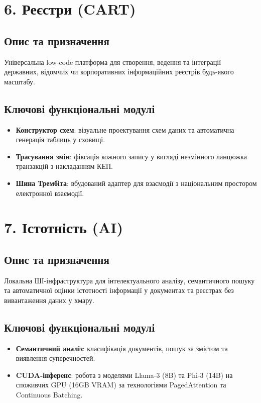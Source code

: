 \section{6. Реєстри (CART)}
\subsection{Опис та призначення}
Універсальна low-code платформа для створення, ведення та інтеграції державних, відомчих чи корпоративних інформаційних реєстрів будь-якого масштабу.
\subsection{Ключові функціональні модулі}
\begin{itemize}
    \item \textbf{Конструктор схем}: візуальне проектування схем даних та автоматична генерація таблиць у сховищі.
    \item \textbf{Трасування змін}: фіксація кожного запису у вигляді незмінного ланцюжка транзакцій з накладанням КЕП.
    \item \textbf{Шина Трембіта}: вбудований адаптер для взаємодії з національним простором електронної взаємодії.
\end{itemize}

\section{7. Істотність (AI)}
\subsection{Опис та призначення}
Локальна ШІ-інфраструктура для інтелектуального аналізу, семантичного пошуку та автоматичної оцінки істотності інформації у документах та реєстрах без вивантаження даних у хмару.
\subsection{Ключові функціональні модулі}
\begin{itemize}
    \item \textbf{Семантичний аналіз}: класифікація документів, пошук за змістом та виявлення суперечностей.
    \item \textbf{CUDA-інференс}: робота з моделями Llama-3 (8B) та Phi-3 (14B) на споживчих GPU (16GB VRAM) за технологіями PagedAttention та Continuous Batching.
\end{itemize}

